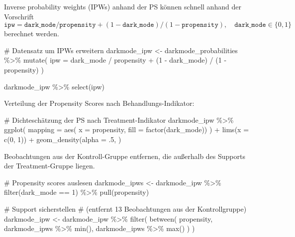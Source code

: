 \documentclass[
  a4paper,
  DIV=11,
  oneside]{scrreprt}
\newenvironment{Shaded}{\begin{snugshade}}{\end{snugshade}}
\newcommand{\NormalTok}[1]{\textcolor[rgb]{0.00,0.23,0.31}{#1}}
\begin{document}
Inverse probability weights (IPWs) anhand der PS können schnell anhand
der Vorschrift
\[\texttt{ipw} = \texttt{dark\_mode} / \texttt{propensity} + (1 - \texttt{dark\_mode}) / (1 - \texttt{propensity}), \quad \texttt{dark\_mode} \in\{0,1\}\]
berechnet werden.

\begin{Shaded}
\begin{Highlighting}[]
\NormalTok{\# Datensatz um IPWs erweitern}
\NormalTok{darkmode\_ipw \textless{}{-} darkmode\_probabilities \%\textgreater{}\%}
\NormalTok{  mutate(}
\NormalTok{    ipw = dark\_mode / propensity + (1 {-} dark\_mode) / (1 {-} propensity)}
\NormalTok{  )}

\NormalTok{darkmode\_ipw \%\textgreater{}\% }
\NormalTok{  select(ipw)}
\end{Highlighting}
\end{Shaded}

Verteilung der Propensity Scores nach Behandlungs-Indikator:

\begin{Shaded}
\begin{Highlighting}[]
\NormalTok{\# Dichteschätzung der PS nach Treatment{-}Indikator}
\NormalTok{darkmode\_ipw \%\textgreater{}\%}
\NormalTok{ggplot(}
\NormalTok{  mapping = aes(}
\NormalTok{    x = propensity, }
\NormalTok{    fill = factor(dark\_mode))}
\NormalTok{  ) + }
\NormalTok{  lims(x = c(0, 1)) +}
\NormalTok{  geom\_density(alpha = .5, )}
\end{Highlighting}
\end{Shaded}

Beobachtungen aus der Kontroll-Gruppe entfernen, die außerhalb des
Supports der Treatment-Gruppe liegen.

\begin{Shaded}
\begin{Highlighting}[]
\NormalTok{\# Propensity scores auslesen}
\NormalTok{darkmode\_ipws \textless{}{-} darkmode\_ipw \%\textgreater{}\% }
\NormalTok{  filter(dark\_mode == 1) \%\textgreater{}\% }
\NormalTok{  pull(propensity)}

\NormalTok{\# Support sicherstellen }
\NormalTok{\# (entfernt 13 Beobachtungen aus der Kontrollgruppe)}
\NormalTok{darkmode\_ipw \textless{}{-} darkmode\_ipw \%\textgreater{}\% }
\NormalTok{  filter(}
\NormalTok{    between(}
\NormalTok{      propensity,}
\NormalTok{      darkmode\_ipws \%\textgreater{}\% }
\NormalTok{        min(),}
\NormalTok{      darkmode\_ipws \%\textgreater{}\% }
\NormalTok{        max()}
\NormalTok{    )}
\NormalTok{  )}
\end{Highlighting}
\end{Shaded}
\end{document}
